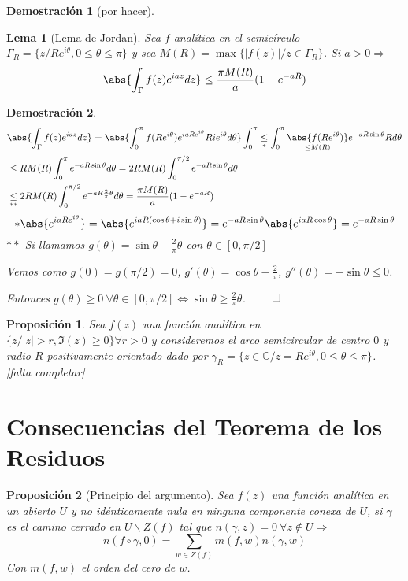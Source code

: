 \documentclass[12pt]{book}
\newtheorem{prop}{Proposición}[chapter]
\newtheorem*{dem}{Demostración}
\newtheorem{lema}{Lema}[chapter]
\newcommand{\C}{\mathbb{C}}
\begin{document}
\begin{dem}[por hacer]
\end{dem}

\begin{lema}[Lema de Jordan]
Sea $f$ analítica en el semicírculo $\Gamma_R = \{z/ Re^{i\theta},0\leq \theta\leq \pi\}$ y sea $M(R) = \max\{|f(z)|/ z\in \Gamma_R\}$. Si $a>0 \Rightarrow$
$$\abs{\int_\Gamma f(z)e^{iaz}dz} \leq \frac{\pi M(R)}{a}(1-e^{-aR})$$
\end{lema}

\begin{dem}
\begin{align*}
&\abs{\int_\Gamma f(z)e^{iaz}dz} = \abs{\int_0^\pi f(Re^{i\theta})e^{iaRe^{i\theta}}Rie^{i\theta}d\theta} \int_0^\pi \underset{*}{\leq} \int_0^\pi \underset{\leq M(R)}{\abs{f(Re^{i\theta})}}e^{-aR\sin\theta}Rd\theta\\
&\leq RM(R)\int_0^\pi e^{-aR\sin\theta}d\theta = 2RM(R)\int_0^{\pi/2} e^{-aR\sin\theta}d\theta\\
&\underset{**}{\leq} 2RM(R)\int_0^{\pi/2} e^{-aR\frac{2}{\pi}\theta}d\theta = \frac{\pi M(R)}{a}(1-e^{-aR})
\end{align*}
$$
* \abs{e^{iaRe^{i\theta}}} = \abs{e^{iaR(\cos\theta + i\sin\theta)}} = e^{-aR\sin\theta}\abs{e^{iaR\cos\theta}}=e^{-aR\sin\theta}
$$
$**$ Si llamamos $g(\theta) = \sin\theta -\frac{2}{\pi}\theta$ con $\theta \in[0,\pi/2]$

Vemos como $g(0) =g(\pi/2)=0$, $g'(\theta) = \cos\theta -\frac{2}{\pi}$, $g''(\theta) = -\sin\theta \leq 0$.

Entonces $g(\theta) \geq 0\ \forall \theta \in[0,\pi/2] \Leftrightarrow \sin\theta \geq \frac{2}{\pi}\theta$. $\qed$
\end{dem}

\begin{prop}
Sea $f(z)$ una función analítica en $\{z/|z|>r,\Im(z)\geq 0\}\forall r>0$ y consideremos el arco semicircular de centro $0$ y radio $R$ positivamente orientado dado por
$\gamma_R = \{z\in\C/ z = Re^{i\theta},0\leq \theta\leq \pi\}$.
[falta completar]
\end{prop}
\section{Consecuencias del Teorema de los Residuos}
\begin{prop}[Principio del argumento]
Sea $f(z)$ una función analítica en un abierto $U$ y no idénticamente nula en ninguna componente conexa de $U$, si $\gamma$ es el camino cerrado en $U\backslash Z(f)$ tal que $n(\gamma,z) = 0\ \forall z \notin U\Rightarrow$
$$n(f\circ\gamma,0) = \sum_{w\in Z(f)} m(f,w)n(\gamma,w)$$
Con $m(f,w)$ el orden del cero de $w$.
\end{prop}
\end{document}
